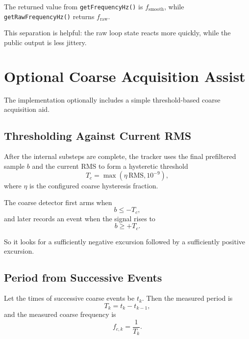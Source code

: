 \documentclass[conference]{IEEEtran}
\begin{document}
    The returned value from \texttt{getFrequencyHz()} is \(f_{\mathrm{smooth}}\),
    while \texttt{getRawFrequencyHz()} returns \(f_{\mathrm{raw}}\).

    This separation is helpful: the raw loop state reacts more quickly, while the
    public output is less jittery.

    \section{Optional Coarse Acquisition Assist}\label{sec:coarse}

    The implementation optionally includes a simple threshold-based coarse
    acquisition aid.

    \subsection{Thresholding Against Current RMS}

    After the internal substeps are complete, the tracker uses the final
    prefiltered sample \(b\) and the current RMS to form a hysteretic threshold
    \begin{equation}
        T_c = \max(\eta\,\mathrm{RMS}, 10^{-9}),
    \end{equation}
    where \(\eta\) is the configured coarse hysteresis fraction.

    The coarse detector first arms when
    \begin{equation}
        b \le -T_c,
    \end{equation}
    and later records an event when the signal rises to
    \begin{equation}
        b \ge +T_c.
    \end{equation}

    So it looks for a sufficiently negative excursion followed by a sufficiently
    positive excursion.

    \subsection{Period from Successive Events}

    Let the times of successive coarse events be \(t_k\). Then the measured period
    is
    \begin{equation}
        T_k = t_k - t_{k-1},
    \end{equation}
    and the measured coarse frequency is
    \begin{equation}
        f_{c,k} = \frac{1}{T_k}.
    \end{equation}
\end{document}
